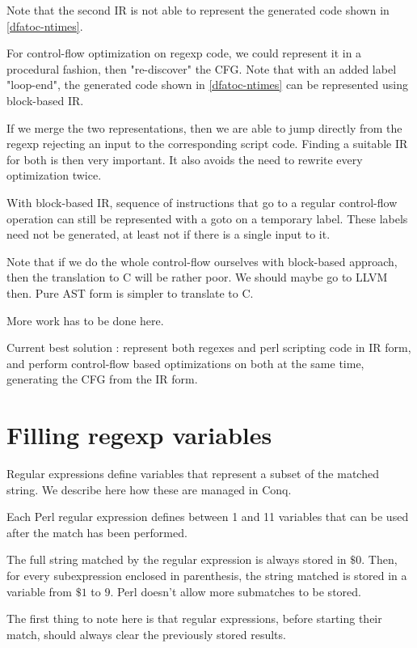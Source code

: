 \documentclass[11pt,a4paper]{report}
\newcommand{\regexp}[1]{$#1$}
\begin{document}
Note that the second IR is not able to represent the generated code shown in \ref{dfatoc-ntimes}.

For control-flow optimization on regexp code, we could represent it in a procedural fashion, then "re-discover" the CFG. Note that with an added label "loop-end", the generated code shown in \ref{dfatoc-ntimes} can be represented using block-based IR.

If we merge the two representations, then we are able to jump directly from the regexp rejecting an input to the corresponding script code. Finding a suitable IR for both is then very important. It also avoids the need to rewrite every optimization twice.

With block-based IR, sequence of instructions that go to a regular control-flow operation can still be represented with a goto on a temporary label. These labels need not be generated, at least not if there is a single input to it.

Note that if we do the whole control-flow ourselves with block-based approach, then the translation to C will be rather poor. We should maybe go to LLVM then. Pure AST form is simpler to translate to C.

More work has to be done here.

Current best solution : represent both regexes and perl scripting code in IR form, and perform control-flow based optimizations on both at the same time, generating the CFG from the IR form.

\section{Filling regexp variables}
\label{regexpvariables}

Regular expressions define variables that represent a subset of the matched string. We describe here how these are managed in Conq.

Each Perl regular expression defines between 1 and 11 variables that can be used after the match has been performed.

The full string matched by the regular expression is always stored in \regexp{\$0}. Then, for every subexpression enclosed in parenthesis, the string matched is stored in a variable from \regexp{\$1} to \regexp{9}. Perl doesn't allow more submatches to be stored.

The first thing to note here is that regular expressions, before starting their match, should always clear the previously stored results.
\end{document}
